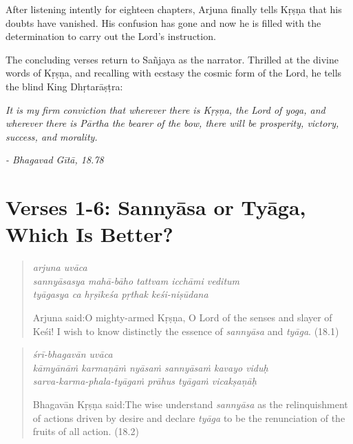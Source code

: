 \documentclass[12pt, twoside, openright]{memoir}
\begin{document}
After listening intently for eighteen chapters, Arjuna finally tells Kṛṣṇa that his doubts have vanished. His confusion has gone and now he is filled with the determination to carry out the Lord’s instruction.

The concluding verses return to Sañjaya as the narrator. Thrilled at the divine words of Kṛṣṇa, and recalling with ecstasy the cosmic form of the Lord, he tells the blind King Dhṛtarāṣṭra:

\begin{customquote}\fontsize{10}{11}\selectfont
\textit{It is my firm conviction that wherever there is Kṛṣṇa, the Lord of \textit{yoga}, and wherever there is Pārtha the bearer of the bow, there will be prosperity, victory, success, and morality.}

\textit{- Bhagavad Gītā, 18.78}
\end{customquote}



\section{Verses 1-6: Sannyāsa or Tyāga, Which Is Better?}\label{sec-verses-1-6-sannyasa-or-tyaga-which-is-better}


\par
\begin{verse}
\textit{arjuna uvāca} \\
\textit{sannyāsasya mahā-bāho tattvam icchāmi veditum} \\
\textit{tyāgasya ca hṛṣīkeśa pṛthak keśi-niṣūdana}

\noindent \quad Arjuna said:\linebreak O mighty-armed Kṛṣṇa, O Lord of the senses and slayer of Keśi! I wish to know distinctly the essence of \textit{sannyāsa} and \textit{tyāga}. (18.1)
\end{verse}
\par



\par
\begin{verse}
\textit{śrī-bhagavān uvāca} \\
\textit{kāmyānāṁ karmaṇāṁ nyāsaṁ sannyāsaṁ kavayo viduḥ} \\
\textit{sarva-karma-phala-tyāgaṁ prāhus tyāgaṁ vicakṣaṇāḥ}

\noindent \quad Bhagavān Kṛṣṇa said:\linebreak The wise understand \textit{sannyāsa} as the relinquishment of actions driven by desire and declare \textit{tyāga} to be the renunciation of the fruits of all action. (18.2)
\end{verse}
\par
\end{document}

